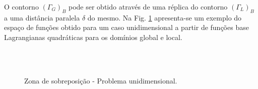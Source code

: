 \documentclass[tese_patricia]{subfiles}
\begin{document}
O contorno $(\Gamma_{G})_{B}$ pode ser obtido através de uma réplica do contorno $(\Gamma_{L})_{B}$ a uma distância paralela $\delta$ do mesmo.  Na Fig. \ref{fig:ZonadeSobreposicao} apresenta-se um exemplo do espaço de funções obtido para um caso unidimensional a partir de funções base Lagrangianas quadráticas para os domínios global e local.


\begin{figure}[!htb]
	\centering
	 \\
	 \\
	\caption{Zona de sobreposição - Problema unidimensional. }
	\label{fig:ZonadeSobreposicao}
\end{figure}
\end{document}
